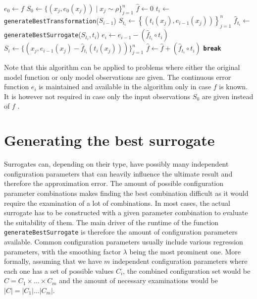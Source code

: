 \documentclass[
  a4paper,  %
  twoside,  %
  bibliography=totoc,
  headsepline,
  cleardoublepage=empty,
  parskip=half,
  draft=false
]{scrbook}
\begin{document}
\newpage
\begin{mdframed}[style=algstyle,frametitle={\textbf{function} \texttt{transformedSurrogateSum}{($f, n$)}}]
\normalsize
\vspace{5.5mm}
\begin{algorithmic}[1]
    \State $e_0 \gets f$
    \State $S_0 \gets \{\left(x_j, e_0(x_j)\right) \mid x_j \sim \rho \}_{j=1}^n$
    \State $\hat{f} \gets 0$
    	\State $t_i \gets$ \texttt{generateBestTransformation}($S_{i - 1}$)
    	\State $S_{t_i} \gets \left\{\left(t_i(x_j), e_{i - 1}(x_j)\right)\right\}_{j=1}^n$
    	\State $\hat{f}_{t_i} \gets$ \texttt{generateBestSurrogate}($S_{t_i}, t_i$)
    	\State $e_i \gets e_{i - 1} - \left(\hat{f}_{t_i} \circ t_i\right)$
    	\State $S_i \gets \{\left(x_j, e_{i - 1}(x_j) - \hat{f}_{t_i}\left(t_i(x_j)\right)\right)\}_{j=1}^n$
    	\State $\hat{f} \gets \hat{f} + \left(\hat{f}_{t_i} \circ t_i\right)$
    		\State  \textbf{\texttt{break}}
    	\EndIf
    \EndFor
    \State {}
\end{algorithmic}
\vspace{-1.5mm}
\delimit
	\label{alg:itappr}
\end{mdframed}
%
Note that this algorithm can be applied to problems where either the original model function or only model observations are given.
The continuous error function $e_i$ is maintained and available in the algorithm only in case $f$ is known.
It is however not required in case only the input observations $S_0$ are given instead of $f$ .

\section{Generating the best surrogate}
\label{sec:gs}

Surrogates can, depending on their type, have possibly many independent configuration parameters that can heavily influence the ultimate result and therefore the approximation error.
The amount of possible configuration parameter combinations makes finding the best combination difficult as it would require the examination of a lot of combinations.
In most cases, the actual surrogate has to be constructed with a given parameter combination to evaluate the suitability of them.
The main driver of the runtime of the function \texttt{generateBestSurrogate} is therefore the amount of configuration parameters available.
Common configuration parameters usually include various regression parameters, with the smoothing factor $\lambda$ being the most prominent one.
More formally, assuming that we have $m$ independent configuration parameters where each one has a set of possible values $C_i$, the combined configuration set would be $C=C_1 \times \dots \times C_m$ and the amount of necessary examinations would be $|C|=|C_1| \dots |C_m|$.
\end{document}
